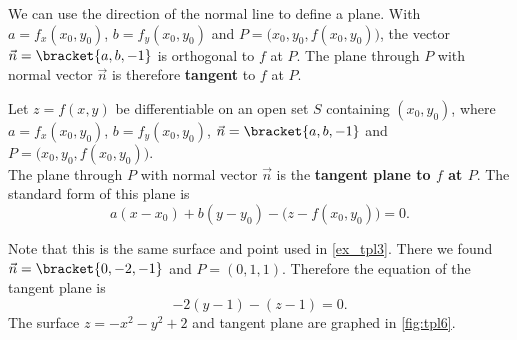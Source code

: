 We can use the direction of the normal line to define a plane. With $a=f_x(x_0,y_0)$, $b=f_y(x_0,y_0)$ and $P = \big(x_0,y_0,f(x_0,y_0)\big)$, the vector $\vec n=\bracket{a,b,-1}$ is orthogonal to $f$ at $P$. The plane through $P$ with normal vector $\vec n$ is therefore \textbf{tangent} to $f$ at $P$.

\begin{definition}\label{def:tangent_plane}
Let $z=f(x,y)$ be differentiable on an open set $S$ containing $(x_0,y_0)$, where
$a = f_x(x_0,y_0)$, $b=f_y(x_0,y_0)$, $\vec n=\bracket{a,b,-1}$ and $P=\big(x_0,y_0,f(x_0,y_0)\big)$.\\

The plane through $P$ with normal vector $\vec n$ is the \textbf{tangent plane to $f$ at $P$}. The standard form of this plane is 
\[a(x-x_0) + b(y-y_0) - \big(z-f(x_0,y_0)\big) = 0.\]
\end{definition}

{Note that this is the same surface and point used in \autoref{ex_tpl3}.
%
%
There we found $\vec n =\bracket{0,-2,-1}$ and $P = (0,1,1)$. Therefore the equation of the tangent plane is
\[-2(y-1)-(z-1)=0.\]
The surface $z=-x^2-y^2+2$ and tangent plane are graphed in \autoref{fig:tpl6}.}

